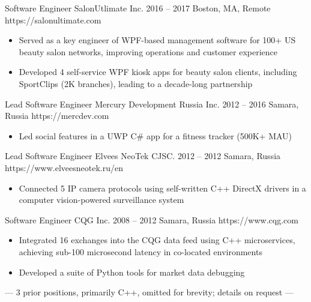 \begin{paracol}{2}
    \cvLeftEvent%
        {Software Engineer}
        {SalonUtlimate Inc.}
        {2016 -- 2017}
        {Boston, MA, Remote}
        {https://salonultimate.com}

        \begin{itemize}
            \item Served as a key engineer of WPF-based management software
                  for 100+ US beauty salon networks, improving operations and customer experience
            \item Developed 4 self-service WPF kiosk apps for beauty salon clients,
                  including SportClips (2K branches), leading to a decade-long partnership
        \end{itemize}

    \cvLeftEvent%
        {Lead Software Engineer}
        {Mercury Development Russia Inc.}
        {2012 -- 2016}
        {Samara, Russia}
        {https://mercdev.com}

        \begin{itemize}
            \item Led social features in a UWP C\# app for a fitness tracker (500K+ MAU)
        \end{itemize}

    \cvLeftEvent%
        {Lead Software Engineer}
        {Elvees NeoTek CJSC.}
        {2012 -- 2012}
        {Samara, Russia}
        {https://www.elveesneotek.ru/en}

        \begin{itemize}
            \item Connected 5 IP camera protocols using self-written C++ DirectX drivers
                  in a computer vision-powered surveillance system
        \end{itemize}

    \cvLeftEvent%
        {Software Engineer}
        {CQG Inc.}
        {2008 -- 2012}
        {Samara, Russia}
        {https://www.cqg.com}

        \begin{itemize}
            \item Integrated 16 exchanges into the CQG data feed using C++ microservices,
                  achieving sub-100 microsecond latency in co-located environments
            \item Developed a suite of Python tools for market data debugging
        \end{itemize}

    \vspace{2pt}
    \centerline{%
        \footnotesize
        \color{cvSecondaryTextColor}
        --- 3 prior positions, primarily C++, omitted for brevity; details on request ---
    }%


\end{paracol}
